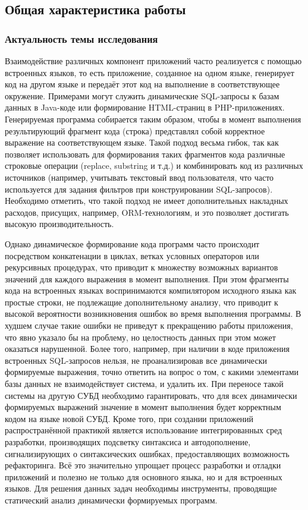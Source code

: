 \subsection*{\Large Общая характеристика работы}
\fontsize{14pt}{15pt}\selectfont
\subsubsection*{\large{Актуальность темы исследования}}

Взаимодействие различных компонент приложений часто реализуется с помощью встроенных языков, то есть приложение, созданное на одном языке, генерирует код на другом языке и передаёт этот код на выполнение в соответствующее окружение. Примерами могут служить динамические SQL-запросы к базам данных в Java-коде или формирование HTML-страниц в PHP-приложениях. Генерируемая программа собирается таким образом, чтобы в момент выполнения результирующий фрагмент кода (строка) представлял собой корректное выражение на соответствующем языке. Такой подход весьма гибок, так как позволяет использовать для формирования таких фрагментов кода различные строковые операции (replace, substring и т.д.) и комбинировать код из различных источников (например, учитывать текстовый ввод пользователя, что часто используется для задания фильтров при конструировании SQL-запросов). Необходимо отметить, что такой подход не имеет дополнительных накладных расходов, присущих, например, ORM-технологиям, и это позволяет достигать высокую производительность. 

Однако динамическое формирование кода программ часто происходит посредством конкатенации в циклах, ветках условных операторов или рекурсивных процедурах, что приводит к множеству возможных вариантов значений для каждого выражения в момент выполнения. При этом фрагменты кода на встроенных языках воспринимаются компилятором исходного языка как простые строки, не подлежащие дополнительному анализу, что приводит к высокой вероятности возникновения ошибок во время выполнения программы. В худшем случае такие ошибки не приведут к прекращению работы приложения, что явно указало бы на проблему, но целостность данных при этом может оказаться нарушенной. Более того, например, при наличии в коде приложения встроенных SQL-запросов нельзя, не проанализировав все динамически формируемые выражения, точно ответить на вопрос о том, с какими элементами базы данных не взаимодействует система, и  удалить их. При переносе такой системы на другую СУБД необходимо гарантировать, что для всех динамически формируемых выражений значение в момент выполнения будет корректным кодом на языке новой СУБД. Кроме того, при создании приложений распространённой практикой является использование интегрированных сред разработки, производящих подсветку синтаксиса и автодополнение, сигнализирующих о синтаксических ошибках, предоставляющих возможность рефакторинга. Всё это значительно упрощает процесс разработки и отладки приложений и полезно не только для основного языка, но и для встроенных языков. Для решения данных задач необходимы инструменты, проводящие статический анализ динамически формируемых программ.  

